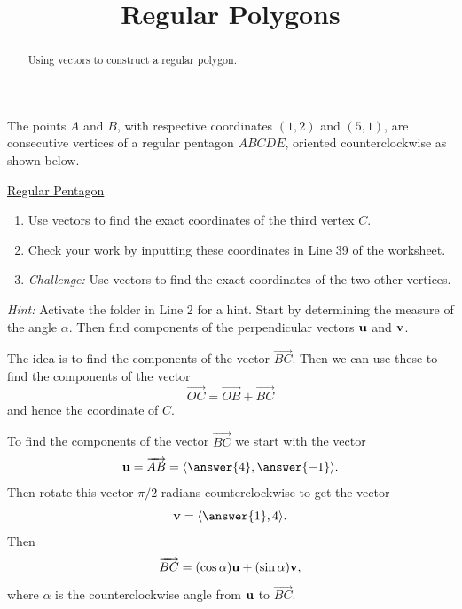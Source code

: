 \documentclass{ximera}
\title{Regular Polygons}
\begin{document}
\begin{abstract}
Using vectors to construct a regular polygon.
\end{abstract}
\maketitle


\begin{question} \label{Qc56r4322}
The points $A$ and $B$, with respective coordinates $(1,2)$ and $(5,1)$, are consecutive vertices of a regular pentagon $ABCDE$, oriented counterclockwise as shown below.



 
\begin{onlineOnly}
    \begin{center}
\end{center}
\end{onlineOnly}

\href{https://www.desmos.com/calculator/77xkbgwqvb}{Regular Pentagon}

\begin{enumerate}
\item Use vectors to find the exact coordinates of the third vertex $C$.

\item Check your work by inputting these coordinates in Line 39 of the worksheet.

\item \emph{Challenge:} Use vectors to find the exact coordinates of the two other vertices.

\end{enumerate}

\emph{Hint:} Activate the folder in Line 2 for a hint. Start by determining the measure of the angle $\alpha$. Then find components of the perpendicular vectors ${\bf u}$ and ${\bf v}$.

\begin{explanation}
The idea is to find the components of the vector $\overrightarrow{BC}$. Then we can use these to find the components of the vector
\[
   \overrightarrow{OC} = \overrightarrow{OB} + \overrightarrow{BC}
\]
and hence the coordinate of $C$.

To find the components of the vector $\overrightarrow{BC}$ we start with the vector
\[
  {\bf u} = \overrightarrow{AB}  = \langle \answer{4}, \answer{-1}  \rangle. 
\]
Then rotate this vector $\pi/2$ radians counterclockwise to get the vector
\[
  {\bf v} = \langle \answer{1} , {4}\rangle . 
\] 
Then 
\[
  \overrightarrow{BC} = (\cos \alpha) {\bf u} + (\sin\alpha) {\bf v} ,
\]
where $\alpha$ is the counterclockwise angle from ${\bf u}$ to $\overrightarrow{BC}$.


\end{explanation}
\end{question}
\end{document}
